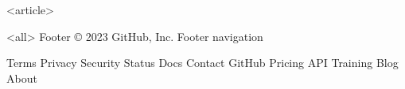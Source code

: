\mode
<article>
{
  \AtBeginDocument{
    \renewcommand<>{\bibitem}{\beameroriginal{\bibitem}}%
  }
}



%
%

\newenvironment{figure}[1][]{%
  \def\@captype{figure}%
  \par\nobreak\begin{center}\nobreak}
  {\par\nobreak\end{center}}
\renewcommand\thefigure{\@arabic\c@figure}

\newenvironment{table}[1][]{%
  \def\@captype{table}%
  \par\nobreak\begin{center}\nobreak}
  {\par\nobreak\end{center}\nobreak}
\renewcommand\thetable{\@arabic\c@table}

\newlength\abovecaptionskip
\newlength\belowcaptionskip
\setlength\abovecaptionskip{7pt}
\setlength\belowcaptionskip{7pt}

\def\caption{%
  \ifx\@captype\@undefined
    \@latex@error{\noexpand\caption outside figure or table}\@ehd
    \expandafter\@gobble
 \else
   \refstepcounter\@captype
   \expandafter\@firstofone
 \fi
 {\@dblarg{\@caption\@captype}}%
}
\long{}
\long{}


\mode
<all>
Footer
© 2023 GitHub, Inc.
Footer navigation

    Terms
    Privacy
    Security
    Status
    Docs
    Contact GitHub
    Pricing
    API
    Training
    Blog
    About

